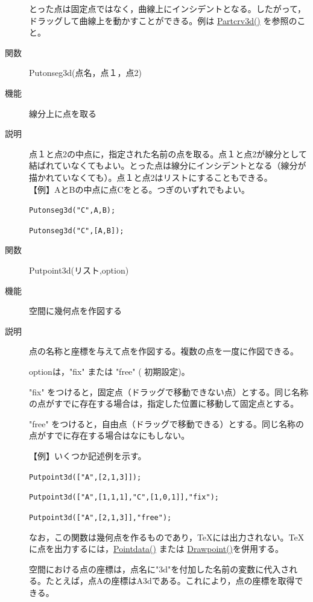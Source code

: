 \documentclass[papersize,a4paper,12pt,uplatex]{jsarticle}
\begin{document}
\begin{description}
とった点は固定点ではなく，曲線上にインシデントとなる。したがって，ドラッグして曲線上を動かすことができる。例は \hyperlink{partcrv3d}{Partcrv3d()} を参照のこと。

\vspace{\baselineskip}
\hypertarget{putonseg3d}{}
\item[関数]  Putonseg3d(点名，点１，点2)
\item[機能]  線分上に点を取る
\item[説明]  点１と点2の中点に，指定された名前の点を取る。点１と点2が線分として結ばれていなくてもよい。とった点は線分にインシデントとなる（線分が描かれていなくても）。点１と点2はリストにすることもできる。\\
\vspace{\baselineskip}
【例】AとBの中点に点Cをとる。つぎのいずれでもよい。

    \verb|Putonseg3d("C",A,B);|

    \verb|Putonseg3d("C",[A,B]);|
    
\vspace{\baselineskip}

\hypertarget{putpoint3d}{}
\item[関数]  Putpoint3d(リスト,option)
\item[機能]  空間に幾何点を作図する
\item[説明]  点の名称と座標を与えて点を作図する。複数の点を一度に作図できる。

optionは，"fix" または "free" ( 初期設定)。
 
"fix" をつけると，固定点（ドラッグで移動できない点）とする。同じ名称の点がすでに存在する場合は，指定した位置に移動して固定点とする。

"free" をつけると，自由点（ドラッグで移動できる）とする。同じ名称の点がすでに存在する場合はなにもしない。

\vspace{\baselineskip}
【例】いくつか記述例を示す。

    \verb|Putpoint3d(["A",[2,1,3]]);|
    
    \verb|Putpoint3d(["A",[1,1,1],"C",[1,0,1]],"fix");|
    
    \verb|Putpoint3d(["A",[2,1,3]],"free");|
    
\vspace{\baselineskip}
  なお，この関数は幾何点を作るものであり，TeXには出力されない。TeXに点を出力するには，\hyperlink{pointdata}{Pointdata()} または \hyperlink{drwpt}{Drawpoint()}を併用する。
  
  空間における点の座標は，点名に"3d"を付加した名前の変数に代入される。たとえば，点Aの座標はA3dである。これにより，点の座標を取得できる。


\end{description}
\end{document}

